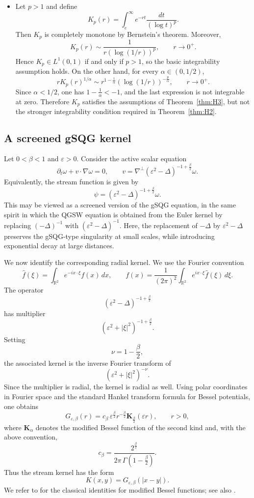 \documentclass[a4paper]{amsart}
\theoremstyle{definition}
\begin{document}
\begin{itemize}
    \item Let \(p>1\) and define
    \[
        K_p(r)=\int_e^\infty e^{-rt}\frac{dt}{(\log t)^p}.
    \]
    Then \(K_p\) is completely monotone by Bernstein's theorem. Moreover,
    \[
        K_p(r)\sim \frac{1}{r(\log(1/r))^p},
        \qquad r\to0^+.
    \]
    Hence \(K_p\in L^1(0,1)\) if and only if \(p>1\), so the basic integrability assumption holds. On the other hand, for every \(\alpha\in(0,1/2)\),
    \[
        rK_p(r)^{1/\alpha}
        \sim
        r^{1-\frac1\alpha}
        (\log(1/r))^{-\frac{p}{\alpha}},
        \qquad r\to0^+.
    \]
    Since \(\alpha<1/2\), one has \(1-\frac1\alpha<-1\), and the last expression is not integrable at zero. Therefore \(K_p\) satisfies the assumptions of Theorem~\ref{thm:H3}, but not the stronger integrability condition required in Theorem~\ref{thm:H2}.
\end{itemize}

\subsection{A screened gSQG kernel}

Let \(0<\beta<1\) and \(\varepsilon>0\). Consider the active scalar equation
\[
    \partial_t\omega+v\cdot\nabla\omega=0,
    \qquad
    v=\nabla^\perp(\varepsilon^2-\Delta)^{-1+\frac{\beta}{2}}\omega .
\]
Equivalently, the stream function is given by
\[
    \psi=(\varepsilon^2-\Delta)^{-1+\frac{\beta}{2}}\omega .
\]
This may be viewed as a screened version of the gSQG equation, in the same spirit in which the QGSW equation is obtained from the Euler kernel by replacing \((-\Delta)^{-1}\) with \((\varepsilon^2-\Delta)^{-1}\). Here, the replacement of \(-\Delta\) by \(\varepsilon^2-\Delta\) preserves the gSQG-type singularity at small scales, while introducing exponential decay at large distances.

We now identify the corresponding radial kernel. We use the Fourier convention
\[
    \widehat f(\xi)=\int_{\mathbb{R}^2}e^{-ix\cdot\xi}f(x)\,dx,
    \qquad
    f(x)=\frac{1}{(2\pi)^2}\int_{\mathbb{R}^2}e^{ix\cdot\xi}\widehat f(\xi)\,d\xi .
\]
The operator
\[
    (\varepsilon^2-\Delta)^{-1+\frac{\beta}{2}}
\]
has multiplier
\[
    (\varepsilon^2+|\xi|^2)^{-1+\frac{\beta}{2}}.
\]
Setting
\[
    \nu=1-\frac{\beta}{2},
\]
the associated kernel is the inverse Fourier transform of
\[
    (\varepsilon^2+|\xi|^2)^{-\nu}.
\]
Since the multiplier is radial, the kernel is radial as well. Using polar coordinates in Fourier space and the standard Hankel transform formula for Bessel potentials, one obtains
\[
    G_{\varepsilon,\beta}(r)
    =
    c_\beta\,
    \varepsilon^{\frac{\beta}{2}}
    r^{-\frac{\beta}{2}}
    \mathbf{K}_{\frac{\beta}{2}}(\varepsilon r),
    \qquad r>0,
\]
where \(\mathbf{K}_{\alpha}\) denotes the modified Bessel function of the second kind and, with the above convention,
\[
    c_\beta
    =
    \frac{2^{\frac{\beta}{2}}}
    {2\pi\,\Gamma(1-\frac{\beta}{2})}.
\]
Thus the stream kernel has the form
\[
    K(x,y)=G_{\varepsilon,\beta}(|x-y|).
\]
We refer to \cite[Chapter 9]{abramowitz1988handbook} for the classical identities for modified Bessel functions; see also \cite{watson1922treatise}.
\end{document}
